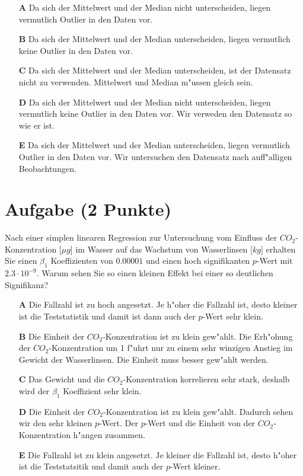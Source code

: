 \documentclass[a4paper, 9pt]{scrartcl}\usepackage[]{graphicx}\usepackage[]{xcolor}
\begin{document}
\begin{enumerate}
\item [\textbf{A} \msquare] Da sich der Mittelwert und der Median nicht unterscheiden, liegen vermutlich Outlier in den Daten vor.
\item [\textbf{B} \msquare] Da sich der Mittelwert und der Median unterscheiden, liegen vermutlich keine Outlier in den Daten vor.
\item [\textbf{C} \msquare] Da sich der Mittelwert und der Median unterscheiden, ist der Datensatz nicht zu verwenden. Mittelwert und Median m{"u}ssen gleich sein.
\item [\textbf{D} \msquare] Da sich der Mittelwert und der Median nicht unterscheiden, liegen vermutlich keine Outlier in den Daten vor. Wir verweden den Datensatz so wie er ist.
\item [\textbf{E} \msquare] Da sich der Mittelwert und der Median unterscheiden, liegen vermutlich Outlier in den Daten vor. Wir untersuchen den Datensatz nach auff{"a}lligen Beobachtungen.
\end{enumerate} 

\section{Aufgabe \hfill (2 Punkte)}

Nach einer simplen linearen Regression zur Untersuchung vom Einfluss der
$CO_2$-Konzentration [$\mu g$] im Wasser auf das Wachstum von Wasserlinsen
[$kg$] erhalten Sie einen $\beta_1$ Koeffizienten von $0.00001$ und einen
hoch signifikanten $p$-Wert mit $2.3\cdot 10^{-9}$. Warum sehen Sie so einen kleinen
Effekt bei einer so deutlichen Signifikanz? 




\begin{enumerate}
\item [\textbf{A} \msquare] Die Fallzahl ist zu hoch angesetzt. Je h{"o}her die Fallzahl ist, desto kleiner ist die Teststatistik und damit ist dann auch der $p$-Wert sehr klein.
\item [\textbf{B} \msquare] Die Einheit der $CO_2$-Konzentration ist zu klein gew{"a}hlt. Die Erh{"o}hung der $CO_2$-Konzentration um 1 f{"u}hrt nur zu einem sehr winzigen Anstieg im Gewicht der Wasserlinsen. Die Einheit muss besser gew{"a}hlt werden.
\item [\textbf{C} \msquare] Das Gewicht und die $CO_2$-Konzentration korrelieren sehr stark, deshalb wird der $\beta_1$ Koeffizient sehr klein.
\item [\textbf{D} \msquare] Die Einheit der $CO_2$-Konzentration ist zu klein gew{"a}hlt. Dadurch sehen wir den sehr kleinen $p$-Wert. Der $p$-Wert und die Einheit von der $CO_2$-Konzentration h{"a}ngen zusammen.
\item [\textbf{E} \msquare] Die Fallzahl ist zu klein angesetzt. Je kleiner die Fallzahl ist, desto h{"o}her ist die Teststatsitik und damit auch der $p$-Wert kleiner. 
\end{enumerate} 
\end{document}
